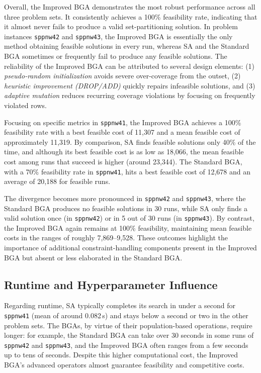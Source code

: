 \documentclass[12pt]{article}
\begin{document}
Overall, the Improved BGA demonstrates the most robust performance across all three problem sets. It consistently achieves a 100\% feasibility rate, indicating that it almost never fails to produce a valid set-partitioning solution. In problem instances \texttt{sppnw42} and \texttt{sppnw43}, the Improved BGA is essentially the only method obtaining feasible solutions in every run, whereas SA and the Standard BGA sometimes or frequently fail to produce any feasible solutions. The reliability of the Improved BGA can be attributed to several design elements: (1) \emph{pseudo-random initialization} avoids severe over-coverage from the outset, (2) \emph{heuristic improvement (DROP/ADD)} quickly repairs infeasible solutions, and (3) \emph{adaptive mutation} reduces recurring coverage violations by focusing on frequently violated rows.

Focusing on specific metrics in \texttt{sppnw41}, the Improved BGA achieves a 100\% feasibility rate with a best feasible cost of 11,307 and a mean feasible cost of approximately 11,319. By comparison, SA finds feasible solutions only 40\% of the time, and although its best feasible cost is as low as 18,066, the mean feasible cost among runs that succeed is higher (around 23,344). The Standard BGA, with a 70\% feasibility rate in \texttt{sppnw41}, hits a best feasible cost of 12,678 and an average of 20,188 for feasible runs.

The divergence becomes more pronounced in \texttt{sppnw42} and \texttt{sppnw43}, where the Standard BGA produces no feasible solutions in 30 runs, while SA only finds a valid solution once (in \texttt{sppnw42}) or in 5 out of 30 runs (in \texttt{sppnw43}). By contrast, the Improved BGA again remains at 100\% feasibility, maintaining mean feasible costs in the ranges of roughly 7,869–9,528. These outcomes highlight the importance of additional constraint-handling components present in the Improved BGA but absent or less elaborated in the Standard BGA.

\subsection{Runtime and Hyperparameter Influence}

Regarding runtime, SA typically completes its search in under a second for \texttt{sppnw41} (mean of around 0.082\,s) and stays below a second or two in the other problem sets. The BGAs, by virtue of their population-based operations, require longer: for example, the Standard BGA can take over 30 seconds in some runs of \texttt{sppnw42} and \texttt{sppnw43}, and the Improved BGA often ranges from a few seconds up to tens of seconds. Despite this higher computational cost, the Improved BGA’s advanced operators almost guarantee feasibility and competitive costs.
\end{document}
